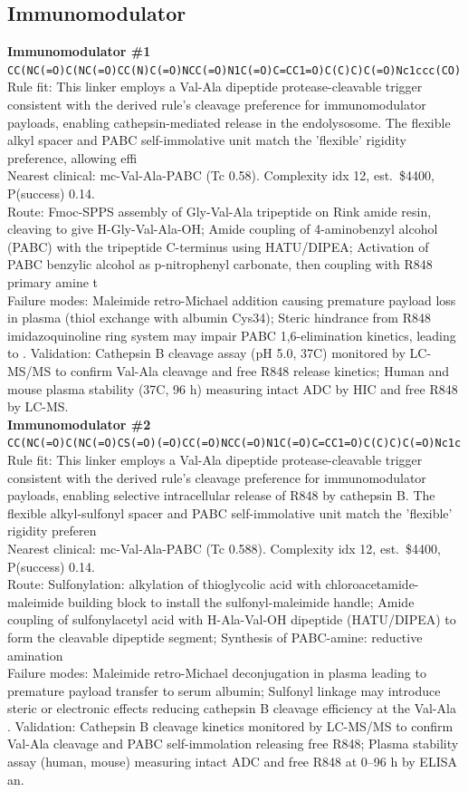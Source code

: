 \documentclass[10pt]{article}
\begin{document}
\subsection{Immunomodulator}
\noindent\textbf{Immunomodulator \#1} \\ \texttt{CC(NC(=O)C(NC(=O)CC(N)C(=O)NCC(=O)N1C(=O)C=CC1=O)C(C)C)C(=O)Nc1ccc(CO)} \\ Rule fit: This linker employs a Val-Ala dipeptide protease-cleavable trigger consistent with the derived rule's cleavage preference for immunomodulator payloads, enabling cathepsin-mediated release in the endolysosome. The flexible alkyl spacer and PABC self-immolative unit match the 'flexible' rigidity preference, allowing effi \\ Nearest clinical: mc-Val-Ala-PABC (Tc 0.58). Complexity idx 12, est.\ \$4400, P(success) 0.14. \\ Route: Fmoc-SPPS assembly of Gly-Val-Ala tripeptide on Rink amide resin, cleaving to give H-Gly-Val-Ala-OH; Amide coupling of 4-aminobenzyl alcohol (PABC) with the tripeptide C-terminus using HATU/DIPEA; Activation of PABC benzylic alcohol as p-nitrophenyl carbonate, then coupling with R848 primary amine t \\ Failure modes: Maleimide retro-Michael addition causing premature payload loss in plasma (thiol exchange with albumin Cys34); Steric hindrance from R848 imidazoquinoline ring system may impair PABC 1,6-elimination kinetics, leading to . Validation: Cathepsin B cleavage assay (pH 5.0, 37\textdegree{}C) monitored by LC-MS/MS to confirm Val-Ala cleavage and free R848 release kinetics; Human and mouse plasma stability (37\textdegree{}C, 96 h) measuring intact ADC by HIC and free R848 by LC-MS. \\[0.4em]
\noindent\textbf{Immunomodulator \#2} \\ \texttt{CC(NC(=O)C(NC(=O)CS(=O)(=O)CC(=O)NCC(=O)N1C(=O)C=CC1=O)C(C)C)C(=O)Nc1c} \\ Rule fit: This linker employs a Val-Ala dipeptide protease-cleavable trigger consistent with the derived rule's cleavage preference for immunomodulator payloads, enabling selective intracellular release of R848 by cathepsin B. The flexible alkyl-sulfonyl spacer and PABC self-immolative unit match the 'flexible' rigidity preferen \\ Nearest clinical: mc-Val-Ala-PABC (Tc 0.588). Complexity idx 12, est.\ \$4400, P(success) 0.14. \\ Route: Sulfonylation: alkylation of thioglycolic acid with chloroacetamide-maleimide building block to install the sulfonyl-maleimide handle; Amide coupling of sulfonylacetyl acid with H-Ala-Val-OH dipeptide (HATU/DIPEA) to form the cleavable dipeptide segment; Synthesis of PABC-amine: reductive amination  \\ Failure modes: Maleimide retro-Michael deconjugation in plasma leading to premature payload transfer to serum albumin; Sulfonyl linkage may introduce steric or electronic effects reducing cathepsin B cleavage efficiency at the Val-Ala . Validation: Cathepsin B cleavage kinetics monitored by LC-MS/MS to confirm Val-Ala cleavage and PABC self-immolation releasing free R848; Plasma stability assay (human, mouse) measuring intact ADC and free R848 at 0--96 h by ELISA an. \\[0.4em]
\end{document}
